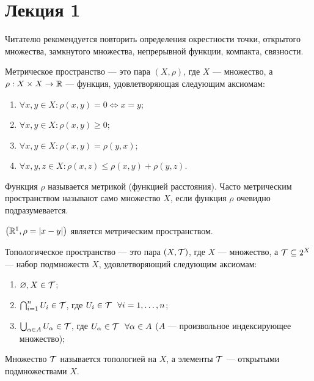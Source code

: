 \section{Лекция 1}

Читателю рекомендуется повторить определения окрестности точки, открытого множества, замкнутого множества, непрерывной функции, компакта, связности.

\begin{definition}
    Метрическое пространство --- это пара $(X, \rho)$, где $X$ --- множество, а $\rho: X \times X \rightarrow \mathbb{R}$ --- функция, удовлетворяющая следующим аксиомам:
    \begin{enumerate}
        \item $\forall x,y \in X: \rho(x,y) = 0 \Leftrightarrow x = y$;
        \item $\forall x,y \in X: \rho(x,y) \geq 0$;
        \item $\forall x,y \in X: \rho(x,y) = \rho(y,x)$;
        \item $\forall x,y,z \in X: \rho(x,z) \leq \rho(x,y) + \rho(y,z)$.
    \end{enumerate}
    Функция $\rho$ называется метрикой (функцией расстояния). Часто метрическим пространством называют само множество $X$, если функция $\rho$ очевидно подразумевается.
\end{definition}

\begin{statement}
    $\left(\mathbb{R}^1 , \rho = \left|x - y\right|\right)$ является метрическим пространством.
\end{statement}

\begin{definition}
    Топологическое пространство --- это пара $(X, \mathcal{T})$, где $X$ --- множество, а $\mathcal{T}  \subseteq 2^X$ --- набор подмножеств $X$, удовлетворяющий следующим аксиомам:
    \begin{enumerate}
        \item $\varnothing,X \in \mathcal{T}$;
        \item $\bigcap_{i = 1}^{n}U_i \in \mathcal{T}$, где $U_i \in \mathcal{T} \ \ \forall i = 1, \ldots, n$;
        \item $\bigcup_{\alpha \in A} U_{\alpha} \in \mathcal{T}$, где $U_{\alpha} \in \mcT \ \ \forall \alpha \in A$ ($A$ --- произвольное индексирующее множество);
    \end{enumerate}
    Множество $\mathcal{T}$ называется топологией на $X$, а элементы $\mathcal{T}$ --- открытыми подмножествами $X$.
\end{definition}


